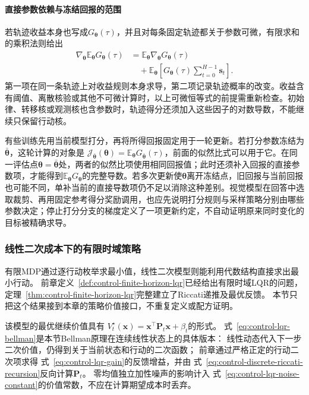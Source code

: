 \paragraph{直接参数依赖与冻结回报的范围}
若轨迹收益本身也写成\(G_{\bm\theta}(\tau)\)，并且对每条固定轨迹都关于参数可微，有限求和的乘积法则给出
\begin{equation}
\begin{aligned}
 \nabla_{\bm\theta}\mathbb E_{\bm\theta}G_{\bm\theta}(\tau)
 &=\mathbb E_{\bm\theta}\nabla_{\bm\theta}G_{\bm\theta}(\tau)\\
 &\quad+\mathbb E_{\bm\theta}
 \left[G_{\bm\theta}(\tau)\sum_{t=0}^{H-1}\bm s_t\right].
 \label{eq:decision-parameter-dependent-return-gradient}
\end{aligned}
\end{equation}
第一项在同一条轨迹上对收益规则本身求导，第二项记录轨迹概率的改变。收益含有阈值、离散核验或其他不可微计算时，以上可微恒等式的前提需重新检查。初始律、转移核或观测核也含参数时，轨迹得分还须加入这些因子的对数导数，不能继续只保留行动核。

有些训练先用当前模型打分，再将所得回报固定用于一轮更新。若打分参数冻结为\(\bar{\bm\theta}\)，这轮计算的对象是
\(\mathcal J_{\bar{\bm\theta}}(\bm\theta)=\mathbb E_{\bm\theta}G_{\bar{\bm\theta}}(\tau)\)，前面的似然比式可以用于它。在同一评估点\(\bm\theta=\bar{\bm\theta}\)处，两者的似然比项使用相同回报值；此时还须补入回报的直接参数项，才能得到\(\mathbb E_{\bm\theta}G_{\bm\theta}\)的完整导数。若多次更新使\(\bm\theta\)离开冻结点，旧回报与当前回报也可能不同，单补当前的直接导数项仍不足以消除这种差别。视觉模型在回答中选取裁剪、再用固定参考得分奖励调用，也应先说明打分规则与采样策略分别由哪些参数决定；停止打分分支的梯度定义了一项更新约定，不自动证明原来同时变化的目标被精确求导。

\subsubsection{线性二次成本下的有限时域策略}

有限MDP通过逐行动枚举求最小值，线性二次模型则能利用代数结构直接求出最小行动。
前章定义~\ref{def:control-finite-horizon-lqr}已经给出有限时域LQR的问题，
定理~\ref{thm:control-finite-horizon-lqr}完整建立了Riccati递推及最优反馈。
本节只把这个结果接到本章的策略价值接口，不重复定义或配方证明。

该模型的最优继续价值具有
$V_t^\star(\bm x)=\bm x^\top\bm P_t\bm x+\beta_t$的形式。
式~\eqref{eq:control-lqr-bellman}是本节Bellman原理在连续线性状态上的具体版本：
线性动态代入下一步二次价值，仍得到关于当前状态和行动的二次函数；
前章通过严格正定的行动二次项求得
式~\eqref{eq:control-lqr-gain}的反馈增益，并由
式~\eqref{eq:control-discrete-riccati-recursion}反向计算$\bm P_t$。
零均值独立加性噪声的影响计入
式~\eqref{eq:control-lqr-noise-constant}的价值常数，不应在计算期望成本时丢弃。

